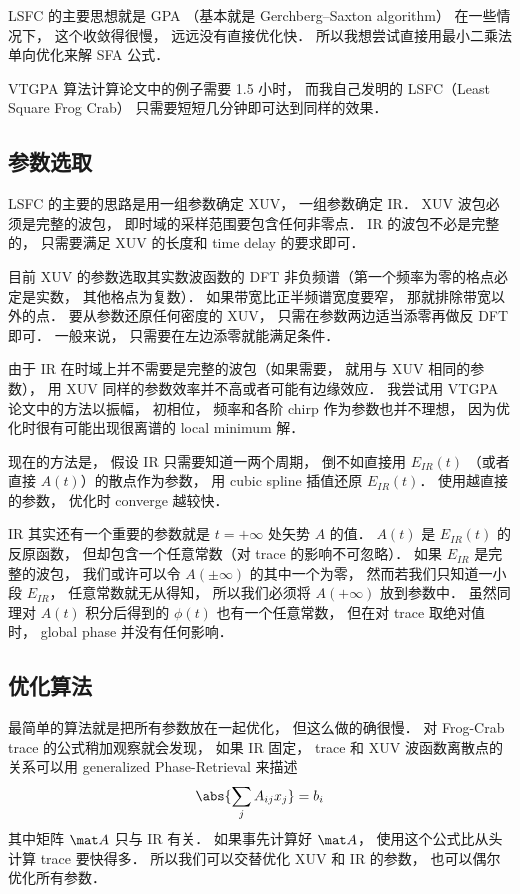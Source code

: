 
LSFC 的主要思想就是 GPA （基本就是 Gerchberg–Saxton algorithm） 在一些情况下， 这个收敛得很慢， 远远没有直接优化快． 所以我想尝试直接用最小二乘法单向优化来解 SFA 公式．

VTGPA 算法计算论文中的例子需要 1.5 小时， 而我自己发明的 LSFC（Least Square Frog Crab） 只需要短短几分钟即可达到同样的效果．

\subsection{参数选取}
LSFC 的主要的思路是用一组参数确定 XUV， 一组参数确定 IR． XUV 波包必须是完整的波包， 即时域的采样范围要包含任何非零点． IR 的波包不必是完整的， 只需要满足 XUV 的长度和 time delay 的要求即可．

目前 XUV 的参数选取其实数波函数的 DFT 非负频谱（第一个频率为零的格点必定是实数， 其他格点为复数）． 如果带宽比正半频谱宽度要窄， 那就排除带宽以外的点． 要从参数还原任何密度的 XUV， 只需在参数两边适当添零再做反 DFT 即可． 一般来说， 只需要在左边添零就能满足条件．

由于 IR 在时域上并不需要是完整的波包（如果需要， 就用与 XUV 相同的参数）， 用 XUV 同样的参数效率并不高或者可能有边缘效应． 我尝试用 VTGPA 论文中的方法以振幅， 初相位， 频率和各阶 chirp 作为参数也并不理想， 因为优化时很有可能出现很离谱的 local minimum 解．

现在的方法是， 假设 IR 只需要知道一两个周期， 倒不如直接用 $E_{IR}(t)$ （或者直接 $A(t)$）的散点作为参数， 用 cubic spline 插值还原 $E_{IR}(t)$． 使用越直接的参数， 优化时 converge 越较快．

IR 其实还有一个重要的参数就是 $t = +\infty$ 处矢势 $A$ 的值． $A(t)$ 是 $E_{IR}(t)$ 的反原函数， 但却包含一个任意常数（对 trace 的影响不可忽略）． 如果 $E_{IR}$ 是完整的波包， 我们或许可以令 $A(\pm\infty)$ 的其中一个为零， 然而若我们只知道一小段 $E_{IR}$， 任意常数就无从得知， 所以我们必须将 $A(+\infty)$ 放到参数中． 虽然同理对 $A(t)$ 积分后得到的 $\phi(t)$ 也有一个任意常数， 但在对 trace 取绝对值时， global phase 并没有任何影响．

\subsection{优化算法}
最简单的算法就是把所有参数放在一起优化， 但这么做的确很慢． 对 Frog-Crab trace 的公式稍加观察就会发现， 如果 IR 固定， trace 和 XUV 波函数离散点的关系可以用 generalized Phase-Retrieval 来描述
\begin{equation}
\abs{\sum_j A_{ij} x_j} = b_i
\end{equation}
其中矩阵 $\mat A$ 只与 IR 有关． 如果事先计算好 $\mat A$， 使用这个公式比从头计算 trace 要快得多． 所以我们可以交替优化 XUV 和 IR 的参数， 也可以偶尔优化所有参数．

